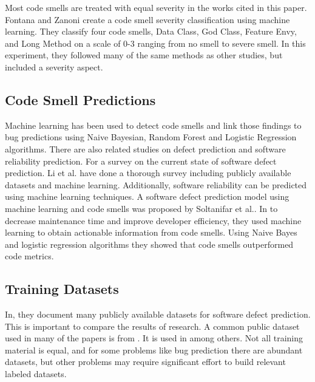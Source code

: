 \documentclass[conference]{IEEEtran}
\begin{document}
Most code smells are treated with equal severity in the works cited in this paper. Fontana and Zanoni\cite{fontana_code_2017} create a code smell severity classification using machine learning. They classify four code smells, Data Class, God Class, Feature Envy, and Long Method on a scale of 0-3 ranging from no smell to severe smell. In this experiment, they followed many of the same methods as other studies, but included a severity aspect.

\subsection{Code Smell Predictions}
Machine learning has been used to detect code smells and link those findings to bug predictions\cite{ubayawardana_bug_2018} using Naive Bayesian, Random Forest and Logistic Regression algorithms.
There are also related studies on defect prediction and software reliability prediction.
For a survey on the current state of software defect prediction\cite{li_progress_2018}. Li et al. have done a thorough survey including publicly available datasets and machine learning.
Additionally, software reliability can be predicted using machine learning techniques\cite{kulamala_predicting_2018}.
A software defect prediction model using machine learning and code smells was proposed by Soltanifar et al.\cite{soltanifar_software_2016}. In\cite{soltanifar_software_2016} to decrease maintenance time and improve developer efficiency, they used machine learning to obtain actionable information from code smells. Using Naive Bayes and logistic regression algorithms they showed that code smells outperformed code metrics.

\subsection{Training Datasets}
In\cite{li_progress_2018}, they document many publicly available datasets for software defect prediction. This is important to compare the results of research.
A common public dataset used in many of the papers is from \cite{fontana_code_2017}. It is used in \cite{karaduzovic-hadziabdic_comparison_2018} among others.
Not all training material is equal\cite{fakhoury_keep_2018}, and for some problems like bug prediction there are abundant datasets, but other problems may require significant effort to build relevant labeled datasets.
\end{document}
